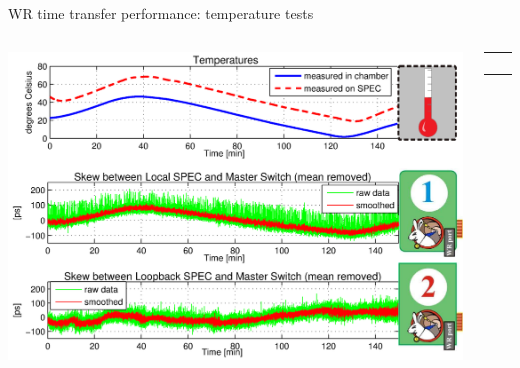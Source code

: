 \documentclass[compress,red]{beamer}
\begin{document}
\begin{frame}{WR time transfer performance: temperature tests}

  \begin{columns}[c]
		\hspace{-1.0cm}
		\begin{center}
		\includegraphics[width=1.1\textwidth]{../../figures/measurements/tempTests-trends_v3.pdf}
		\end{center}

		\begin{center}
		  \begin{table}[!t] \footnotesize 
		  \begin{tabular}{ c  c }     
		  \multicolumn{2}{c}{ }       \\         
		   \multicolumn{2}{c}{ }       \\    
		     &    \\ 
		    &     \\ 
		  \end{tabular}
		  \end{table}   		
		\end{center}


\end{columns}
\end{frame}
\end{document}
